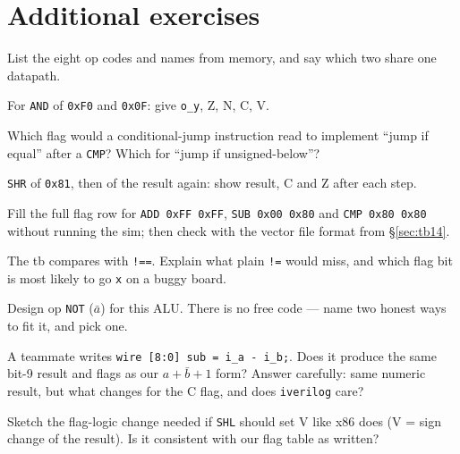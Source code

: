 \section*{Additional exercises}

\begin{exercise}[easy]
List the eight op codes and names from memory, and say which two share
one datapath.
\end{exercise}
\begin{exercise}[easy]
For \texttt{AND} of \texttt{0xF0} and \texttt{0x0F}: give
\texttt{o\_y}, Z, N, C, V.
\end{exercise}
\begin{exercise}[easy]
Which flag would a conditional-jump instruction read to implement
``jump if equal'' after a \texttt{CMP}? Which for ``jump if
unsigned-below''?
\end{exercise}
\begin{exercise}[easy]
\texttt{SHR} of \texttt{0x81}, then of the result again: show result,
C and Z after each step.
\end{exercise}
\begin{exercise}[medium]
Fill the full flag row for \texttt{ADD 0xFF 0xFF}, \texttt{SUB 0x00
0x80} and \texttt{CMP 0x80 0x80} without running the sim; then check
with the vector file format from \S\ref{sec:tb14}.
\end{exercise}
\begin{exercise}[medium]
The tb compares with \texttt{!==}. Explain what plain \texttt{!=}
would miss, and which flag bit is most likely to go \texttt{x} on a
buggy board.
\end{exercise}
\begin{exercise}[medium]
Design op \texttt{NOT} ($\bar a$) for this ALU. There is no free code
--- name two honest ways to fit it, and pick one.
\end{exercise}
\begin{exercise}[medium]
A teammate writes \texttt{wire [8:0] sub = i\_a - i\_b;}. Does it
produce the same bit-9 result and flags as our
$a+\bar b+1$ form? Answer carefully: same numeric result, but what
changes for the C flag, and does \texttt{iverilog} care?
\end{exercise}
\begin{exercise}[medium]
Sketch the flag-logic change needed if \texttt{SHL} should set V like
x86 does (V = sign change of the result). Is it consistent with our
flag table as written?
\end{exercise}
